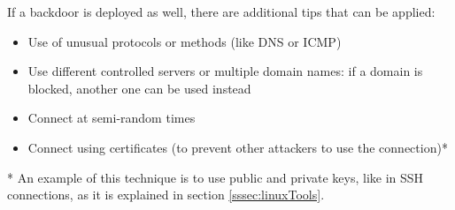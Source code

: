 If a backdoor is deployed as well, there are additional tips that can be applied:
\begin{itemize}
\item Use of unusual protocols or methods (like DNS or ICMP)
\item Use different controlled servers or multiple domain names: if a domain is blocked, another one can be used instead
\item Connect at semi-random times
\item Connect using certificates (to prevent other attackers to use the connection)*
\end{itemize}

* An example of this technique is to use public and private keys, like in SSH connections, as it is explained in section \ref{sssec:linuxTools}.